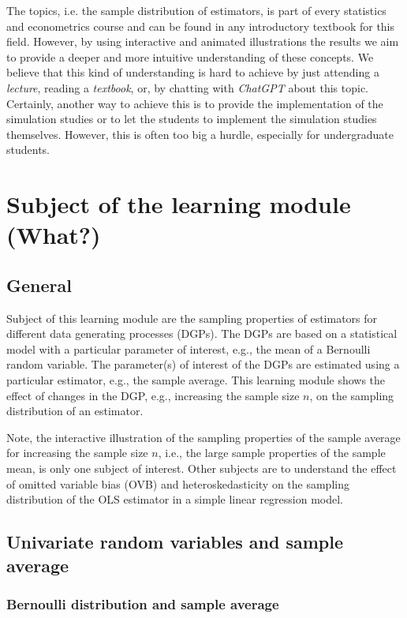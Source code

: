 \documentclass{article}
\begin{document}
The topics, i.e. the sample distribution of estimators, is part of every statistics and econometrics course and can be found in any introductory textbook for this field. 
%
However, by using interactive and animated illustrations the results we aim to provide a deeper and more intuitive understanding of these concepts. 
%
We believe that this kind of understanding is hard to achieve by just attending a \emph{lecture}, reading a \emph{textbook}, or, by chatting with \emph{ChatGPT} about this topic. 
%
Certainly, another way to achieve this is to provide the implementation of the simulation studies or to let the students to implement the simulation studies themselves. 
%
However, this is often too big a hurdle, especially for undergraduate students. 

\section{Subject of the learning module (What?)}

\subsection{General}

Subject of this learning module are the sampling properties of estimators for different data generating processes (DGPs). 
%
The DGPs are based on a statistical model with a particular parameter of interest, e.g., the mean of a Bernoulli random variable. 
%
The parameter(s) of interest of the DGPs are estimated using a particular estimator, e.g., the sample average. 
%
This learning module shows the effect of changes in the DGP, e.g., increasing the sample size $n$, on the sampling distribution of an estimator. 

Note, the interactive illustration of the sampling properties of the sample average for increasing the sample size $n$, i.e., the large sample properties of the sample mean, is only one subject of interest. 
%
Other subjects are to understand the effect of omitted variable bias (OVB) and heteroskedasticity on the sampling distribution of the OLS estimator in a simple linear regression model.

\subsection{Univariate random variables and sample average}

\subsubsection{Bernoulli distribution and sample average}
\end{document}
